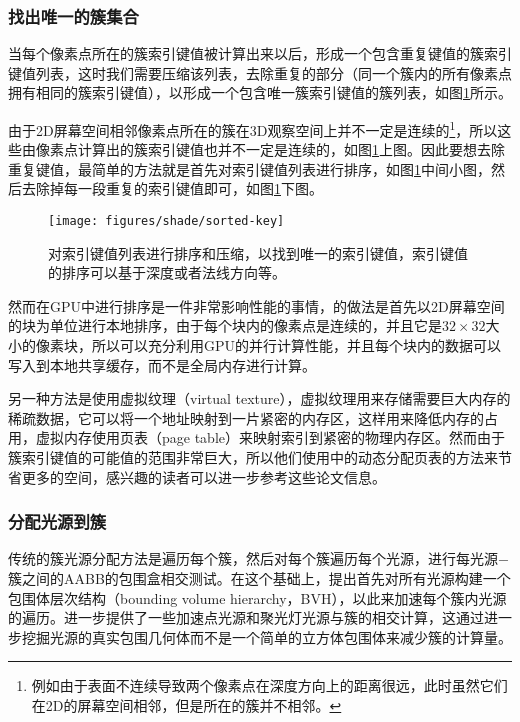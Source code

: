 \subsubsection{找出唯一的簇集合}
当每个像素点所在的簇索引键值被计算出来以后，形成一个包含重复键值的簇索引键值列表，这时我们需要压缩该列表，去除重复的部分（同一个簇内的所有像素点拥有相同的簇索引键值），以形成一个包含唯一簇索引键值的簇列表，如图\ref{f:shade-sorted-key}所示。

由于2D屏幕空间相邻像素点所在的簇在3D观察空间上并不一定是连续的\footnote{例如由于表面不连续导致两个像素点在深度方向上的距离很远，此时虽然它们在2D的屏幕空间相邻，但是所在的簇并不相邻。}，所以这些由像素点计算出的簇索引键值也并不一定是连续的，如图\ref{f:shade-sorted-key}上图。因此要想去除重复键值，最简单的方法就是首先对索引键值列表进行排序，如图\ref{f:shade-sorted-key}中间小图，然后去除掉每一段重复的索引键值即可，如图\ref{f:shade-sorted-key}下图。

\begin{figure}
\begin{center}
	\texttt{[image: figures/shade/sorted-key]}
\end{center}
	\caption{对索引键值列表进行排序和压缩，以找到唯一的索引键值，索引键值的排序可以基于深度或者法线方向等。}
	\label{f:shade-sorted-key}
\end{figure}

然而在GPU中进行排序是一件非常影响性能的事情，\cite{a:ClusteredDeferredandForwardShading}的做法是首先以2D屏幕空间的块为单位进行本地排序，由于每个块内的像素点是连续的，并且它是$32\times 32$大小的像素块，所以可以充分利用GPU的并行计算性能，并且每个块内的数据可以写入到本地共享缓存，而不是全局内存进行计算。

另一种方法是使用虚拟纹理\cite{a:VirtualTexturing}（virtual texture），虚拟纹理用来存储需要巨大内存的稀疏数据，它可以将一个地址映射到一片紧密的内存区，这样用来降低内存的占用，虚拟内存使用页表（page table）来映射索引到紧密的物理内存区。然而由于簇索引键值的可能值的范围非常巨大，所以他们使用\cite{a:Glift:GenericEfficientRandom-AccessGPUDataStructures}中的动态分配页表的方法来节省更多的空间，感兴趣的读者可以进一步参考这些论文信息。






\subsubsection{分配光源到簇}
传统的簇光源分配方法是遍历每个簇，然后对每个簇遍历每个光源，进行每光源$-$簇之间的AABB的包围盒相交测试。在这个基础上，\cite{a:ClusteredDeferredandForwardShading}提出首先对所有光源构建一个包围体层次结构（bounding volume hierarchy，BVH），以此来加速每个簇内光源的遍历。\cite{a:PracticalClusteredShading}进一步提供了一些加速点光源和聚光灯光源与簇的相交计算，这通过进一步挖掘光源的真实包围几何体而不是一个简单的立方体包围体来减少簇的计算量。

